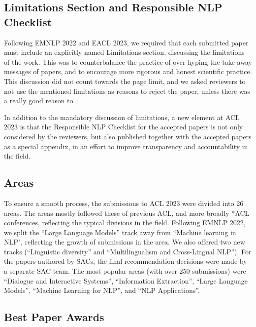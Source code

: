 \subsection*{Limitations Section and Responsible NLP Checklist}

Following EMNLP 2022 and EACL 2023, we required that each submitted paper must include an explicitly named Limitations section, discussing the limitations of the work. This was to counterbalance the practice of over-hyping the take-away messages of papers, and to encourage more rigorous and honest scientific practice. This discussion did not count towards the page limit, and we asked reviewers to not use the mentioned limitations as reasons to reject the paper, unless there was a really good reason to.

In addition to the mandatory discussion of limitations, a new element at ACL 2023 is that the Responsible NLP Checklist for the accepted papers is not only considered by the reviewers, but also published together with the accepted papers as a special appendix, in an effort to improve transparency and accountability in the field.

\subsection*{Areas}
To ensure a smooth process, the submissions to ACL 2023 were divided into 26 areas. The areas mostly followed these of previous ACL, and more broadly *ACL conferences, reflecting the typical divisions in the field. Following EMNLP 2022, we split the ``Large Language Models'' track away from ``Machine learning in NLP", reflecting the growth of submissions in the area. We also offered two new tracks (``Linguistic diversity'' and ``Multilingualism and Cross-Lingual NLP''). For the papers authored by SACs, the final recommendation decisions were made by a separate SAC team. 
The most popular areas (with over 250 submissions) were ``Dialogue and Interactive Systems'', ``Information Extraction'', ``Large Language Models'', ``Machine Learning for NLP'', and ``NLP Applications''.

\subsection*{Best Paper Awards}

